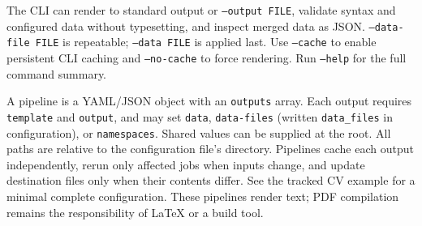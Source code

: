The CLI can render to standard output or \texttt{--output FILE}, validate syntax
and configured data without typesetting, and inspect merged data as JSON.
\texttt{--data-file FILE} is repeatable; \texttt{--data FILE} is applied last.
Use \texttt{--cache} to enable persistent CLI caching and \texttt{--no-cache} to
force rendering. Run \texttt{--help} for the full command summary.

A pipeline is a YAML/JSON object with an \texttt{outputs} array. Each output
requires \texttt{template} and \texttt{output}, and may set \texttt{data},
\texttt{data-files} (written \texttt{data\_files} in configuration), or
\texttt{namespaces}. Shared values can be supplied at the root. All paths are
relative to the configuration file's directory. Pipelines cache each output
independently, rerun only affected jobs when inputs change, and update destination
files only when their contents differ. See the tracked CV example for a minimal
complete configuration. These pipelines render text; PDF compilation remains the
responsibility of LaTeX or a build tool.
